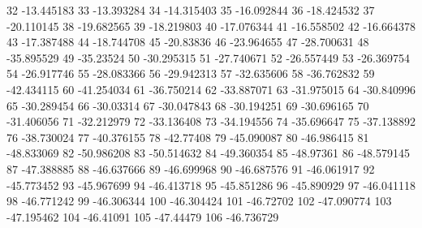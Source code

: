 32                      -13.445183
33                      -13.393284
34                      -14.315403
35                      -16.092844
36                      -18.424532
37                      -20.110145
38                      -19.682565
39                      -18.219803
40                      -17.076344
41                      -16.558502
42                      -16.664378
43                      -17.387488
44                      -18.744708
45                       -20.83836
46                      -23.964655
47                      -28.700631
48                      -35.895529
49                       -35.23524
50                      -30.295315
51                      -27.740671
52                      -26.557449
53                      -26.369754
54                      -26.917746
55                      -28.083366
56                      -29.942313
57                      -32.635606
58                      -36.762832
59                      -42.434115
60                      -41.254034
61                      -36.750214
62                      -33.887071
63                      -31.975015
64                      -30.840996
65                      -30.289454
66                       -30.03314
67                      -30.047843
68                      -30.194251
69                      -30.696165
70                      -31.406056
71                      -32.212979
72                      -33.136408
73                      -34.194556
74                      -35.696647
75                      -37.138892
76                      -38.730024
77                      -40.376155
78                       -42.77408
79                      -45.090087
80                      -46.986415
81                      -48.833069
82                      -50.986208
83                      -50.514632
84                      -49.360354
85                       -48.97361
86                      -48.579145
87                      -47.388885
88                      -46.637666
89                      -46.699968
90                      -46.687576
91                      -46.061917
92                      -45.773452
93                      -45.967699
94                      -46.413718
95                      -45.851286
96                      -45.890929
97                      -46.041118
98                      -46.771242
99                      -46.306344
100                      -46.304424
101                       -46.72702
102                      -47.090774
103                      -47.195462
104                       -46.41091
105                       -47.44479
106                      -46.736729
